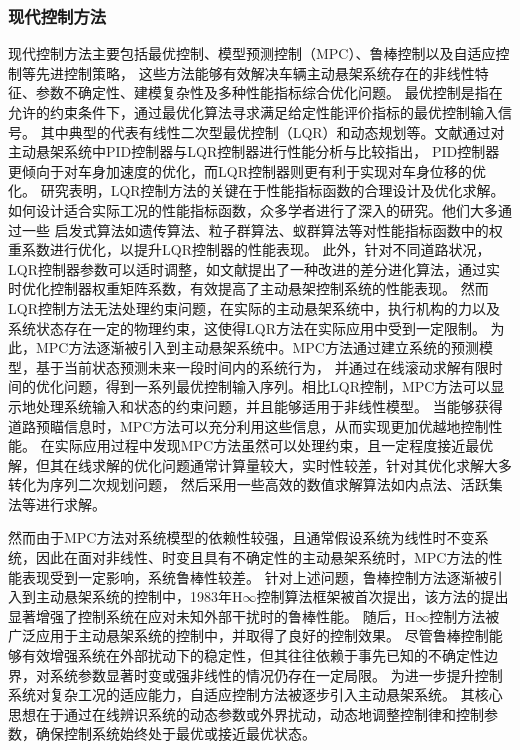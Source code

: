 \subsubsection{现代控制方法}
现代控制方法主要包括最优控制、模型预测控制（MPC）、鲁棒控制以及自适应控制等先进控制策略，
这些方法能够有效解决车辆主动悬架系统存在的非线性特征、参数不确定性、建模复杂性及多种性能指标综合优化问题。
最优控制是指在允许的约束条件下，通过最优化算法寻求满足给定性能评价指标的最优控制输入信号。
其中典型的代表有线性二次型最优控制（LQR）和动态规划等。文献通过对主动悬架系统中PID控制器与LQR控制器进行性能分析与比较指出，
PID控制器更倾向于对车身加速度的优化，而LQR控制器则更有利于实现对车身位移的优化。
研究表明，LQR控制方法的关键在于性能指标函数的合理设计及优化求解。如何设计适合实际工况的性能指标函数，众多学者进行了深入的研究。他们大多通过一些
启发式算法如遗传算法、粒子群算法、蚁群算法等对性能指标函数中的权重系数进行优化，以提升LQR控制器的性能表现\cite{Ren_Funkhouser_2023,2023GA}。
此外，针对不同道路状况，LQR控制器参数可以适时调整，如文献提出了一种改进的差分进化算法，通过实时优化控制器权重矩阵系数，有效提高了主动悬架控制系统的性能表现。
然而LQR控制方法无法处理约束问题，在实际的主动悬架系统中，执行机构的力以及系统状态存在一定的物理约束，这使得LQR方法在实际应用中受到一定限制。
为此，MPC方法逐渐被引入到主动悬架系统中。MPC方法通过建立系统的预测模型，基于当前状态预测未来一段时间内的系统行为，
并通过在线滚动求解有限时间的优化问题，得到一系列最优控制输入序列。相比LQR控制，MPC方法可以显示地处理系统输入和状态的约束问题，并且能够适用于非线性模型。
当能够获得道路预瞄信息时，MPC方法可以充分利用这些信息，从而实现更加优越地控制性能\cite{2022Active,2019Regionless,2024Model}。
在实际应用过程中发现MPC方法虽然可以处理约束，且一定程度接近最优解，但其在线求解的优化问题通常计算量较大，实时性较差，针对其优化求解大多转化为序列二次规划问题，
然后采用一些高效的数值求解算法如内点法、活跃集法等进行求解\cite{JSYZ202505014}。


然而由于MPC方法对系统模型的依赖性较强，且通常假设系统为线性时不变系统，因此在面对非线性、时变且具有不确定性的主动悬架系统时，MPC方法的性能表现受到一定影响，系统鲁棒性较差。
针对上述问题，鲁棒控制方法逐渐被引入到主动悬架系统的控制中，1983年H$\infty$控制算法框架被首次提出\cite{song2024_preview_suspension_cn}，该方法的提出显著增强了控制系统在应对未知外部干扰时的鲁棒性能。
随后，H$\infty$控制方法被广泛应用于主动悬架系统的控制中，并取得了良好的控制效果\cite{zhang2019Hinf,Afshar2023Hinf}。
尽管鲁棒控制能够有效增强系统在外部扰动下的稳定性，但其往往依赖于事先已知的不确定性边界，对系统参数显著时变或强非线性的情况仍存在一定局限。
为进一步提升控制系统对复杂工况的适应能力，自适应控制方法被逐步引入主动悬架系统\cite{zhao2022adaptive,2013Adaptive}。
其核心思想在于通过在线辨识系统的动态参数或外界扰动，动态地调整控制律和控制参数，确保控制系统始终处于最优或接近最优状态。

